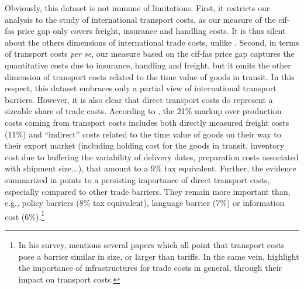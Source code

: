 \documentclass[a4paper,11pt]{article}
\begin{document}
Obviously, this dataset is not immune of limitations. First, it restricts our analysis to the study of international transport costs, as our measure of the cif-fas price gap only covers freight, insurance and handling costs. It is thus silent about the others dimensions of international trade costs, unlike \citet{Irrazabal_2015}. Second, in terms of transport costs \textit{per se}, our measure based on the cif-fas price gap captures the quantitative costs due to insurance, handling and freight, but it omits the other dimension of transport costs related to the time value of goods in transit. In this respect, this dataset embraces only a partial view of international transport barriers.
However, it is also clear that direct transport costs do represent a sizeable share of trade costs. According to \citet{anderson_wincoop_jel}, the 21\% markup over production costs coming from transport costs includes both directly measured freight costs (11\%) and ``indirect'' costs related to the time value of goods on their way to their export market (including holding cost for the goods in transit, inventory cost due to buffering the variability of delivery dates, preparation costs associated with shipment size...), that amount to a  9\% tax equivalent. Further, the evidence summarized in \citet{anderson_wincoop_jel} points to a persisting importance of direct transport costs, especially compared to other trade barriers. They remain more important than, e.g., policy barriers (8\% tax equivalent), language barrier (7\%) or information cost (6\%).\footnote{In his survey, \citet{Hummels_1999} mentions several papers which all point that transport costs pose a barrier similar in size, or larger than tariffs. In the same vein, \citet{limao_venables} highlight the importance of infrastructures for trade costs in general, through their impact on transport costs.}
\end{document}
